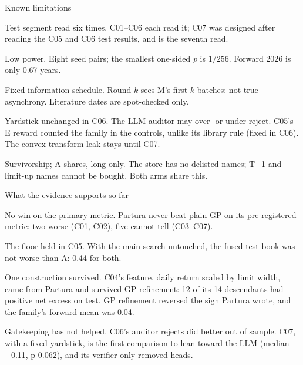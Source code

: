 \documentclass[t,20pt]{beamer}
\newcommand\key[1]{{\mediumfont\color{accent}#1}}
\newcommand\lead[1]{{\mediumfont #1}}
\newenvironment{blist}{%
  \begin{list}{\textcolor{sec}{\textbullet}}{\def\makelabel##1{##1\hfil}%
    \setlength\leftmargin{0.34in}\setlength\labelwidth{0.2in}\setlength\labelsep{0.14in}%
    \setlength\itemsep{16pt}\setlength\parsep{0pt}\setlength\topsep{0pt}\setlength\partopsep{0pt}%
    \setlength\itemindent{0pt}\setlength\listparindent{0pt}\setlength\rightmargin{0pt}}}%
  {\end{list}}
\newcounter{nl}
\newenvironment{nlist}{%
  \begin{list}{\textcolor{sec}{\arabic{nl}}}{\usecounter{nl}\def\makelabel##1{##1\hfil}%
    \setlength\leftmargin{0.40in}\setlength\labelwidth{0.26in}\setlength\labelsep{0.14in}%
    \setlength\itemsep{26pt}\setlength\parsep{0pt}\setlength\topsep{0pt}\setlength\partopsep{0pt}%
    \setlength\itemindent{0pt}\setlength\listparindent{0pt}\setlength\rightmargin{0pt}}}%
  {\end{list}}
\newcommand\textfirst{\vspace*{-0.14in}}
\begin{document}
\begin{frame}{Known limitations}
\textfirst
\begin{blist}
  \item \lead{Test segment read six times.} C01–C06 each read it; C07 was designed after reading the C05 and C06 test results, and is the seventh read.
  \item \lead{Low power.} Eight seed pairs; the smallest one-sided $p$ is $1/256$. Forward 2026 is only 0.67 years.
  \item \lead{Fixed information schedule.} Round $k$ sees M's first $k$ batches: not true asynchrony. Literature dates are spot-checked only.
  \item \lead{Yardstick unchanged in C06.} The LLM auditor may over- or under-reject. C05's E reward counted the family in the controls, unlike its library rule (fixed in C06). The convex-transform leak stays until C07.
  \item \lead{Survivorship; A-shares, long-only.} The store has no delisted names; T+1 and limit-up names cannot be bought. Both arms share this.
\end{blist}
\end{frame}

\begin{frame}{What the evidence supports so far}
\textfirst
\begin{nlist}
  \item \lead{No win on the primary metric.} Partura never beat plain GP on its pre-registered metric: two \key{worse} (C01, C02), five \key{cannot tell} (C03–C07).
  \item \lead{The floor held in C05.} With the main search untouched, the fused test book was not worse than A: 0.44 for both.
  \item \lead{One construction survived.} C04's feature, daily return scaled by limit width, came from Partura and survived GP refinement:
    12 of its 14 descendants had positive net excess on test. GP refinement reversed the sign Partura wrote, and the family's forward mean was 0.04.
  \item \lead{Gatekeeping has not helped.} C06's auditor rejects did better out of sample. C07, with a fixed yardstick, is the \key{first} comparison to lean toward the LLM (median +0.11, p 0.062), and its verifier only removed heads.
\end{nlist}
\end{frame}
\end{document}
